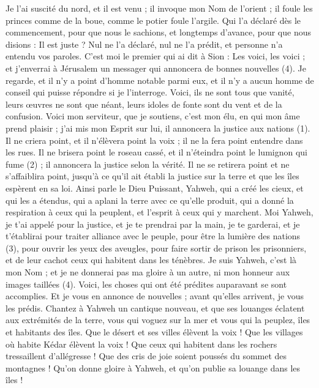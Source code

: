 \begin{multicols}{2}
{Je l'ai suscité du nord, et il est venu ; il invoque mon Nom de l’orient ; il foule les princes comme de la boue, comme le potier foule l’argile.
Qui l’a déclaré dès le commencement, pour que nous le sachions, et longtemps d’avance, pour que nous disions : Il est juste ? Nul ne l’a déclaré, nul ne l’a prédit, et personne n’a entendu vos paroles.
C’est moi le premier qui ai dit à Sion : Les voici, les voici ; et j’enverrai à Jérusalem un messager qui annoncera de bonnes nouvelles (4).
Je regarde, et il n'y a point d'homme notable parmi eux, et il n'y a aucun homme de conseil qui puisse répondre si je l’interroge.
Voici, ils ne sont tous que vanité, leurs œuvres ne sont que néant, leurs idoles de fonte sont du vent et de la confusion.
\VerseOne{}Voici mon serviteur, que je soutiens, c'est mon élu, en qui mon âme prend plaisir ; j'ai mis mon Esprit sur lui, il annoncera la justice aux nations (1).
Il ne criera point, et il n’élèvera point la voix ; il ne la fera point entendre dans les rues.
Il ne brisera point le roseau cassé, et il n'éteindra point le lumignon qui fume (2) ; il annoncera la justice selon la vérité.
Il ne se retirera point et ne s’affaiblira point, jusqu’à ce qu’il ait établi la justice sur la terre et que les îles espèrent en sa loi.
Ainsi parle le Dieu Puissant, Yahweh, qui a créé les cieux, et qui les a étendus, qui a aplani la terre avec ce qu'elle produit, qui a donné la respiration à ceux qui la peuplent, et l'esprit à ceux qui y marchent.
Moi Yahweh, je t'ai appelé pour la justice, et je te prendrai par la main, je te garderai, et je t’établirai pour traiter alliance avec le peuple, pour être la lumière des nations (3),
pour ouvrir les yeux des aveugles, pour faire sortir de prison les prisonniers, et de leur cachot ceux qui habitent dans les ténèbres.
Je suis Yahweh, c'est là mon Nom ; et je ne donnerai pas ma gloire à un autre, ni mon honneur aux images taillées (4).
Voici, les choses qui ont été prédites auparavant se sont accomplies. Et je vous en annonce de nouvelles ; avant qu’elles arrivent, je vous les prédis.
Chantez à Yahweh un cantique nouveau, et que ses louanges éclatent aux extrémités de la terre, vous qui voguez sur la mer et vous qui la peuplez, îles et habitants des îles.
Que le désert et ses villes élèvent la voix ! Que les villages où habite Kédar élèvent la voix ! Que ceux qui habitent dans les rochers tressaillent d’allégresse ! Que des cris de joie soient poussés du sommet des montagnes !
Qu'on donne gloire à Yahweh, et qu'on publie sa louange dans les îles !
}
\end{multicols}

